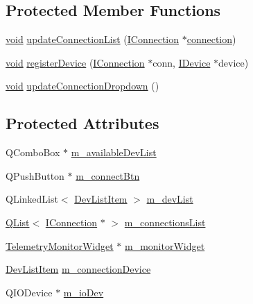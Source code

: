\subsection*{Protected Member Functions}
\begin{DoxyCompactItemize}
\item 
\hyperlink{group___u_a_v_objects_plugin_ga444cf2ff3f0ecbe028adce838d373f5c}{void} \hyperlink{group___core_plugin_ga68a1ceabeebd789c2e750636ac621dd3}{update\-Connection\-List} (\hyperlink{class_core_1_1_i_connection}{I\-Connection} $\ast$\hyperlink{group___i_p_conn_plugin_ga75cb9b33b52928c030806876f2c2f439}{connection})
\item 
\hyperlink{group___u_a_v_objects_plugin_ga444cf2ff3f0ecbe028adce838d373f5c}{void} \hyperlink{group___core_plugin_ga385cde399fab0cd3df254656dfe99179}{register\-Device} (\hyperlink{class_core_1_1_i_connection}{I\-Connection} $\ast$conn, \hyperlink{class_core_1_1_i_device}{I\-Device} $\ast$device)
\item 
\hyperlink{group___u_a_v_objects_plugin_ga444cf2ff3f0ecbe028adce838d373f5c}{void} \hyperlink{group___core_plugin_ga822df7d9f4473a60eec505d04a52a4b6}{update\-Connection\-Dropdown} ()
\end{DoxyCompactItemize}
\subsection*{Protected Attributes}
\begin{DoxyCompactItemize}
\item 
Q\-Combo\-Box $\ast$ \hyperlink{group___core_plugin_ga41f481dd82dd9c22a44f9f8c3fb67b13}{m\-\_\-available\-Dev\-List}
\item 
Q\-Push\-Button $\ast$ \hyperlink{group___core_plugin_gae7f2456d42992a7c1979e22333ef8c8c}{m\-\_\-connect\-Btn}
\item 
Q\-Linked\-List$<$ \hyperlink{class_core_1_1_dev_list_item}{Dev\-List\-Item} $>$ \hyperlink{group___core_plugin_ga59dba38b0aaf7818a55f5324e04cbfb4}{m\-\_\-dev\-List}
\item 
\hyperlink{class_q_list}{Q\-List}$<$ \hyperlink{class_core_1_1_i_connection}{I\-Connection} $\ast$ $>$ \hyperlink{group___core_plugin_ga3fc983f808dffe4688e191179b08008b}{m\-\_\-connections\-List}
\item 
\hyperlink{class_telemetry_monitor_widget}{Telemetry\-Monitor\-Widget} $\ast$ \hyperlink{group___core_plugin_ga1c7867a16d4a6ee88c874f5e39e0dae8}{m\-\_\-monitor\-Widget}
\item 
\hyperlink{class_core_1_1_dev_list_item}{Dev\-List\-Item} \hyperlink{group___core_plugin_ga37d57c467eac74260d1ca5c4ec46c149}{m\-\_\-connection\-Device}
\item 
Q\-I\-O\-Device $\ast$ \hyperlink{group___core_plugin_gae83fe34fd2dab9f0c6459abbfcd6be27}{m\-\_\-io\-Dev}
\end{DoxyCompactItemize}


